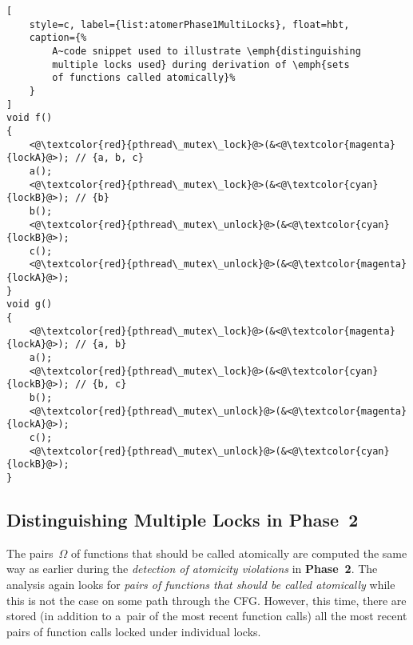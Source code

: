 \begin{lstlisting}[
    style=c, label={list:atomerPhase1MultiLocks}, float=hbt,
    caption={%
        A~code snippet used to illustrate \emph{distinguishing
        multiple locks used} during derivation of \emph{sets
        of functions called atomically}%
    }
]
void f()
{
    <@\textcolor{red}{pthread\_mutex\_lock}@>(&<@\textcolor{magenta}{lockA}@>); // {a, b, c}
    a();
    <@\textcolor{red}{pthread\_mutex\_lock}@>(&<@\textcolor{cyan}{lockB}@>); // {b}
    b();
    <@\textcolor{red}{pthread\_mutex\_unlock}@>(&<@\textcolor{cyan}{lockB}@>);
    c();
    <@\textcolor{red}{pthread\_mutex\_unlock}@>(&<@\textcolor{magenta}{lockA}@>);
}
void g()
{
    <@\textcolor{red}{pthread\_mutex\_lock}@>(&<@\textcolor{magenta}{lockA}@>); // {a, b}
    a();
    <@\textcolor{red}{pthread\_mutex\_lock}@>(&<@\textcolor{cyan}{lockB}@>); // {b, c}
    b();
    <@\textcolor{red}{pthread\_mutex\_unlock}@>(&<@\textcolor{magenta}{lockA}@>);
    c();
    <@\textcolor{red}{pthread\_mutex\_unlock}@>(&<@\textcolor{cyan}{lockB}@>);
}
\end{lstlisting}

\subsection{Distinguishing Multiple Locks in Phase~2}
\label{sec:proposalMultiLocksPhase2}

The pairs~$ \Omega $ of functions that should be called atomically are
computed the same way as earlier during the \emph{detection of atomicity
violations} in \textbf{Phase~2}. The analysis again looks for \emph{pairs
of functions that should be called atomically} while this is not the case
on some path through the CFG. However, this time, there are stored (in addition
to a~pair of the most recent function calls) all the most recent pairs of
function calls locked under individual locks.

